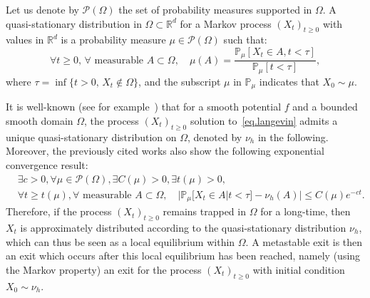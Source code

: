 \begin{definition} Let us denote by $\mathcal P(\Omega)$ the set of
probability measures supported in $\Omega$. A quasi-stationary
distribution in $\Omega \subset \mathbb R^d$
for a Markov process $(X_t)_{t \ge 0}$ with values in $\mathbb R^d$
is a probability measure $\mu \in \mathcal P(\Omega)$
such that:
\[
\forall t\ge 0,\, \forall \text{ measurable }A\subset\Omega, \quad
\mu (A)=\frac{ \mathbb P_\mu \left[X_t \in A, t<\tau\right] }{ \mathbb P_\mu \left[t<\tau \right]},
\]
where $\tau = \inf\{t >0, \, X_t \not \in \Omega\}$, and the subscript
$\mu$ in $\mathbb P_\mu$ indicates that $X_0 \sim \mu$.
\end{definition}
It is well-known (see for
example~\cite{le2012mathematical,ChampagnatCoulibaly}) that for a
smooth potential $f$ and a bounded smooth domain $\Omega$, the process
$(X_t)_{t \ge0}$ solution to~\eqref{eq.langevin} admits a unique
quasi-stationary distribution on $\Omega$, denoted by
$\nu_h$ in the following. Moreover, the
previously cited works also show the following exponential convergence
result:
\begin{equation}\label{eq.con-c}
\begin{aligned}
&\exists c>0, \forall \mu \in \mathcal P(\Omega), \exists C(\mu)>0, \exists t(\mu)>0,\\
&\forall t\ge t(\mu), \forall \text{ measurable }A\subset\Omega, \quad \big \vert \mathbb P_\mu\big[X_t\in A\big | t<\tau \big] -\nu_h(A) \big \vert \le C(\mu)e^{-ct}.
\end{aligned}
\end{equation}
Therefore, if the process $(X_t)_{t \ge0}$ remains trapped in $\Omega$
for a long-time, then $X_t$ is approximately distributed according to the
quasi-stationary distribution $\nu_h$, which can thus be seen as a
local equilibrium within $\Omega$. A metastable exit is then an exit
which occurs after this local equilibrium has been reached, namely
(using the Markov property)
an exit for the process $(X_t)_{t \ge0}$ with initial condition $X_0
\sim \nu_h$.

